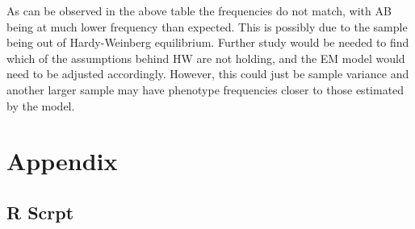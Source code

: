 \documentclass{article}
\begin{document}
	As can be observed in the above table the frequencies do not match, with AB being at much lower frequency than expected. This is possibly due to the sample being out of Hardy-Weinberg equilibrium. Further study would be needed to find which of the assumptions behind HW are not holding, and the EM model would need to be adjusted accordingly. However, this could just be sample variance and another larger sample may have phenotype frequencies closer to those estimated by the model. 
	
	\section{Appendix}
	
	\appendix
	
	\subsection{R Scrpt}
\end{document}
